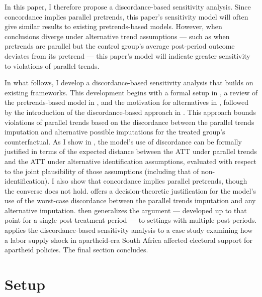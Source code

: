 \documentclass[twoside,11pt]{article}
\begin{document}
In this paper, I therefore propose a discordance-based sensitivity analysis. Since concordance implies parallel pretrends, this paper's sensitivity model will often give similar results to existing pretrends-based models. However, when conclusions diverge under alternative trend assumptions --- such as when pretrends are parallel but the control group's average post-period outcome deviates from its pretrend --- this paper's model will indicate greater sensitivity to violations of parallel trends.

In what follows, I develop a discordance-based sensitivity analysis that builds on existing frameworks. This development begins with a formal setup in , a review of the pretrends-based model in , and the motivation for alternatives in , followed by the introduction of the discordance-based approach in . This approach bounds violations of parallel trends based on the discordance between the parallel trends imputation and alternative possible imputations for the treated group's counterfactual. As I show in , the model's use of discordance can be formally justified in terms of the expected distance between the \textrm{ATT} under parallel trends and the \textrm{ATT} under alternative identification assumptions, evaluated with respect to the joint plausibility of those assumptions (including that of non-identification). I also show that concordance implies parallel pretrends, though the converse does not hold.  offers a decision-theoretic justification for the model's use of the worst-case discordance between the parallel trends imputation and any alternative imputation.  then generalizes the argument --- developed up to that point for a single post-treatment period --- to settings with multiple post-periods.  applies the discordance-based sensitivity analysis to a case study examining how a labor supply shock in apartheid-era South Africa affected electoral support for apartheid policies. The final section concludes.

\section{Setup} \label{sec: setup}
\end{document}
